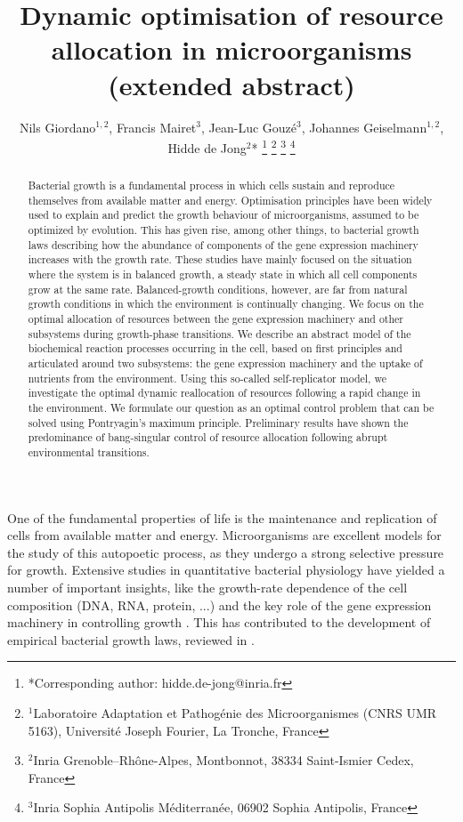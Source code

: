 \documentclass[a4paper, 10pt, conference]{ieeeconf}      %
\title{\LARGE \bf
Dynamic optimisation of resource allocation in microorganisms (extended abstract)
}
\author{Nils Giordano$^{1,2}$, Francis Mairet$^{3}$, Jean-Luc Gouzé$^{3}$, Johannes Geiselmann$^{1,2}$, Hidde de Jong$^{2}$*%
\thanks{*Corresponding author: hidde.de-jong@inria.fr}%
\thanks{$^{1}$Laboratoire Adaptation et Pathog\'enie des Microorganismes (CNRS UMR 5163),
Universit\'e Joseph Fourier,
La Tronche, France}
\thanks{$^{2}$Inria Grenoble--Rh\^one-Alpes, Montbonnot, 38334 Saint-Ismier Cedex, France}
\thanks{$^{3}$Inria Sophia Antipolis M\'editerran\'ee, 06902 Sophia Antipolis, France}
}
\begin{document}
\maketitle
\thispagestyle{empty}
\pagestyle{empty}
\begin{abstract}

Bacterial growth is a fundamental process in which cells sustain and reproduce themselves from available matter and energy.
Optimisation principles have been widely used to explain and predict the growth behaviour of microorganisms, assumed to be optimized by evolution.
This has given rise, among other things, to bacterial growth laws describing how the abundance of components of the gene expression machinery increases with the growth rate. These studies have mainly focused on the situation where the system is in balanced growth, a steady state in which all cell components grow at the same rate.
Balanced-growth conditions, however, are far from natural growth conditions in which the environment is continually changing.
We focus on the optimal allocation of resources between the gene expression machinery and other subsystems during growth-phase transitions.
We describe an abstract model of the biochemical reaction processes occurring in the cell, based on first principles and articulated around two subsystems: the gene expression machinery and the uptake of nutrients from the environment.
Using this so-called self-replicator model, we investigate the optimal dynamic reallocation of resources following a rapid change in the environment.
We formulate our question as an optimal control problem that can be solved using Pontryagin's maximum principle.
Preliminary results have shown the predominance of bang-singular control of resource allocation following abrupt environmental transitions.
\end{abstract}

One of the fundamental properties of life is the maintenance and replication of cells from available matter and energy.
Microorganisms are excellent models for the study of this autopoetic process, as they undergo a strong selective pressure for growth.
Extensive studies in quantitative bacterial physiology have yielded a number of important insights, like the growth-rate dependence of the cell composition (DNA, RNA, protein, ...) and the key role of the gene expression machinery in controlling growth \cite{scott_interdependence_2010,bremer_modulation_1996,maaloe_control_1966}.
This has contributed to the development of empirical bacterial growth laws, reviewed in \cite{scott_bacterial_2011}.
\end{document}
